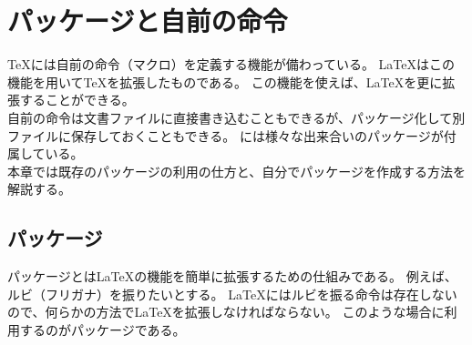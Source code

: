 \chapter{パッケージと自前の命令}
\TeX{}には自前の命令（マクロ）を定義する機能が備わっている。
\LaTeX{}はこの機能を用いて\TeX{}を拡張したものである。
この機能を使えば、\LaTeX{}を更に拡張することができる。\\

自前の命令は文書ファイルに直接書き込むこともできるが、パッケージ化して別ファイルに保存しておくこともできる。
\LaTeXe{}には様々な出来合いのパッケージが付属している。\\

本章では既存のパッケージの利用の仕方と、自分でパッケージを作成する方法を解説する。
\section{パッケージ}
パッケージとは\LaTeX{}の機能を簡単に拡張するための仕組みである。
例えば、ルビ（フリガナ）を振りたいとする。
\LaTeX{}にはルビを振る命令は存在しないので、何らかの方法で\LaTeX{}を拡張しなければならない。
このような場合に利用するのがパッケージである。\\

